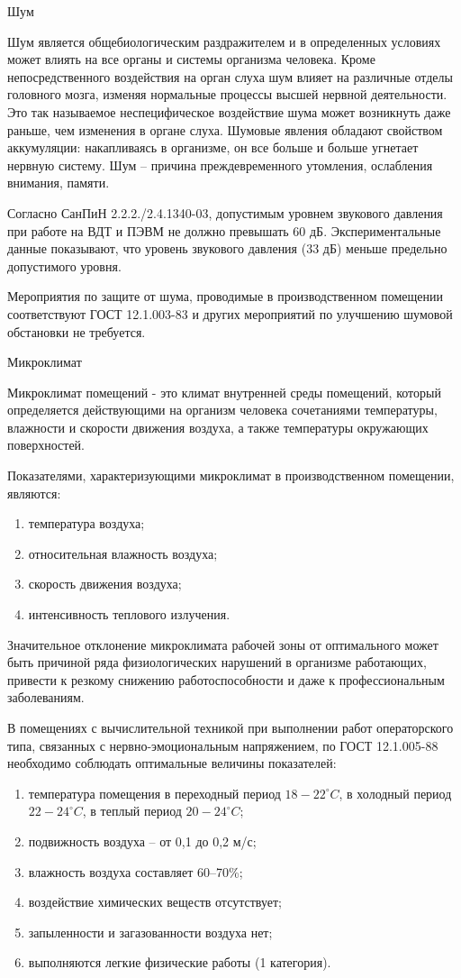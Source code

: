 \point Шум

Шум является общебиологическим раздражителем и в определенных условиях может влиять на все органы и системы организма человека.
Кроме непосредственного воздействия на орган слуха шум влияет на различные отделы головного мозга, изменяя нормальные процессы высшей нервной деятельности.
Это так называемое неспецифическое воздействие шума может возникнуть даже раньше, чем изменения в органе слуха.
Шумовые явления обладают свойством аккумуляции: накапливаясь в организме, он все больше и больше угнетает нервную систему.
Шум -- причина преждевременного утомления, ослабления внимания, памяти.

Согласно СанПиН 2.2.2./2.4.1340-03, допустимым уровнем звукового давления при работе на ВДТ и ПЭВМ не должно превышать 60 дБ.
Экспериментальные данные показывают, что уровень звукового давления (33 дБ) меньше предельно допустимого уровня.

Мероприятия по защите от шума, проводимые в производственном помещении соответствуют ГОСТ 12.1.003-83 и других мероприятий по улучшению шумовой обстановки не требуется.

\point Микроклимат

Микроклимат помещений - это климат внутренней среды помещений, который определяется действующими на организм человека сочетаниями температуры, влажности и скорости движения воздуха, а также температуры окружающих поверхностей.

Показателями, характеризующими микроклимат в производственном помещении, являются:

\begin{enumerate}
	\item температура воздуха;
	\item относительная влажность воздуха;
	\item скорость движения воздуха;
	\item интенсивность теплового излучения.
\end{enumerate}

Значительное отклонение микроклимата рабочей зоны от оптимального может быть причиной ряда физиологических нарушений в организме работающих, привести к резкому снижению работоспособности и даже к профессиональным заболеваниям.

В помещениях с вычислительной техникой при выполнении работ операторского типа, связанных с нервно-эмоциональным напряжением, по ГОСТ 12.1.005-88 необходимо соблюдать оптимальные величины показателей:

\begin{enumerate}
	\item температура помещения в переходный период $18-22^{\circ}C$, в холодный период $22-24^{\circ}C$, в теплый период $20-24^{\circ}C$;
	\item подвижность воздуха – от 0,1 до 0,2 м/с;
	\item влажность воздуха составляет 60--70\%;
	\item воздействие химических веществ отсутствует;
	\item запыленности и загазованности воздуха нет;
	\item выполняются легкие физические работы (1 категория).
\end{enumerate}

